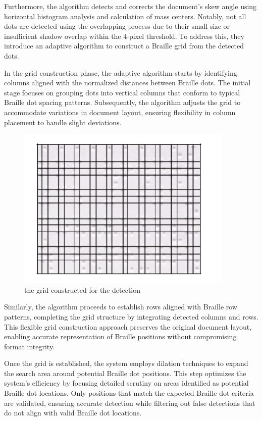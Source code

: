  Furthermore, the algorithm detects and corrects the document's skew angle using horizontal histogram analysis and calculation of mass centers. Notably, not all dots are detected using the overlapping process due to their small size or insufficient shadow overlap within the 4-pixel threshold. To address this, they introduce an adaptive algorithm to construct a Braille grid from the detected dots. 
 


In the grid construction phase, the adaptive algorithm starts by identifying columns aligned with the normalized distances between Braille dots. The initial stage focuses on grouping dots into vertical columns that conform to typical Braille dot spacing patterns. Subsequently, the algorithm adjusts the grid to accommodate variations in document layout, ensuring flexibility in column placement to handle slight deviations.
\begin{figure}[!ht]
\centering
\includegraphics[]{grif.PNG}
\caption{the grid constructed for the detection}
\label{fig:acc}
\end{figure}


Similarly, the algorithm proceeds to establish rows aligned with Braille row patterns, completing the grid structure by integrating detected columns and rows. This flexible grid construction approach preserves the original document layout, enabling accurate representation of Braille positions without compromising format integrity.

Once the grid is established, the system employs dilation techniques to expand the search area around potential Braille dot positions. This step optimizes the system's efficiency by focusing detailed scrutiny on areas identified as potential Braille dot locations. Only positions that match the expected Braille dot criteria are validated, ensuring accurate detection while filtering out false detections that do not align with valid Braille dot locations.

